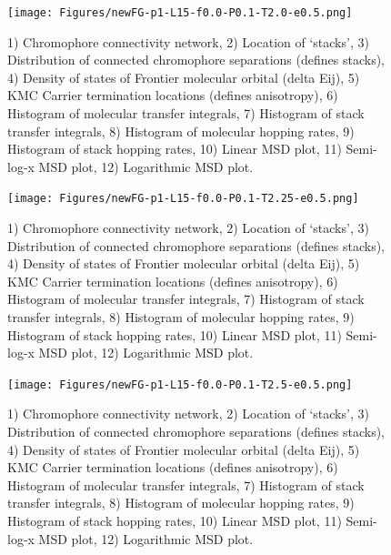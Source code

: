 \documentclass[12pt]{article}
\begin{document}
\begin{figure}[h]\centering
	\texttt{[image: Figures/newFG-p1-L15-f0.0-P0.1-T2.0-e0.5.png]}
    \caption{   1) Chromophore connectivity network, 
                2) Location of `stacks', 
                3) Distribution of connected chromophore separations (defines stacks),
                4) Density of states of Frontier molecular orbital (delta Eij),
                5) KMC Carrier termination locations (defines anisotropy),
                6) Histogram of molecular transfer integrals,
                7) Histogram of stack transfer integrals,
                8) Histogram of molecular hopping rates,
                9) Histogram of stack hopping rates,
                10) Linear MSD plot,
                11) Semi-log-x MSD plot,
                12) Logarithmic MSD plot.}
	\label{fig:noMapT2.0}
\end{figure}


\begin{figure}[h]\centering
	\texttt{[image: Figures/newFG-p1-L15-f0.0-P0.1-T2.25-e0.5.png]}
    \caption{   1) Chromophore connectivity network, 
                2) Location of `stacks', 
                3) Distribution of connected chromophore separations (defines stacks),
                4) Density of states of Frontier molecular orbital (delta Eij),
                5) KMC Carrier termination locations (defines anisotropy),
                6) Histogram of molecular transfer integrals,
                7) Histogram of stack transfer integrals,
                8) Histogram of molecular hopping rates,
                9) Histogram of stack hopping rates,
                10) Linear MSD plot,
                11) Semi-log-x MSD plot,
                12) Logarithmic MSD plot.}
	\label{fig:noMapT2.25}
\end{figure}


\begin{figure}[h]\centering
	\texttt{[image: Figures/newFG-p1-L15-f0.0-P0.1-T2.5-e0.5.png]}
    \caption{   1) Chromophore connectivity network, 
                2) Location of `stacks', 
                3) Distribution of connected chromophore separations (defines stacks),
                4) Density of states of Frontier molecular orbital (delta Eij),
                5) KMC Carrier termination locations (defines anisotropy),
                6) Histogram of molecular transfer integrals,
                7) Histogram of stack transfer integrals,
                8) Histogram of molecular hopping rates,
                9) Histogram of stack hopping rates,
                10) Linear MSD plot,
                11) Semi-log-x MSD plot,
                12) Logarithmic MSD plot.}
	\label{fig:noMapT2.5}
\end{figure}


\clearpage




\end{document}
